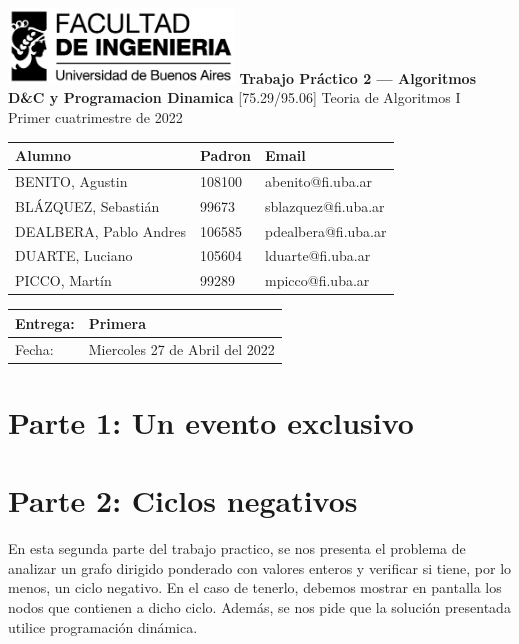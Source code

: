 \documentclass[titlepage,a4paper]{article}
\author{Pablo Andres Dealbera}
\date{\today}
\title{}
\begin{document}
\begin{titlepage}
	\hfill\includegraphics[width=6cm]{assets/logofiuba.jpg}
    \centering
    \vfill
    \Huge \textbf{Trabajo Práctico 2 — Algoritmos D\&C y Programacion Dinamica}
    \vskip2cm
    \Large [75.29/95.06] Teoria de Algoritmos I\\
    Primer cuatrimestre de 2022\\
    \vfill
    \begin{tabular}{ | l | l | l | }
      \hline
      Alumno & Padron & Email \\ \hline
      BENITO, Agustin & 108100 & abenito@fi.uba.ar \\ \hline
      BLÁZQUEZ, Sebastián & 99673 & sblazquez@fi.uba.ar \\ \hline
      DEALBERA, Pablo Andres & 106585 & pdealbera@fi.uba.ar \\ \hline
      DUARTE, Luciano & 105604 & lduarte@fi.uba.ar \\ \hline
      PICCO, Martín & 99289 & mpicco@fi.uba.ar \\ \hline
  	\end{tabular}
    \vfill
    \begin{tabular}{ | l | l | }
      \hline
      Entrega: & Primera \\ \hline
      Fecha: & Miercoles 27 de Abril del 2022 \\ \hline
  	\end{tabular}
    \vfill
    \vfill
\end{titlepage}
\tableofcontents
\newpage
{}

\section{Parte 1: Un evento exclusivo}
\label{sec:org99e4f8b}

\section{Parte 2: Ciclos negativos}
\label{sec:org34905c5}

En esta segunda parte del trabajo practico, se nos presenta el problema de
analizar un grafo dirigido ponderado con valores enteros y verificar si tiene,
por lo menos, un ciclo negativo. En el caso de tenerlo, debemos mostrar en
pantalla los nodos que contienen a dicho ciclo. Además, se nos pide que la
solución presentada utilice programación dinámica.
\end{document}

